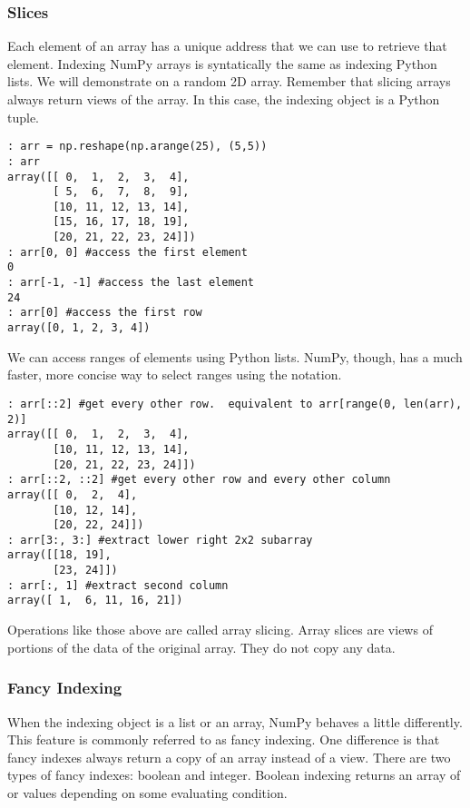 \subsubsection*{Slices}
Each element of an array has a unique address that we can use to retrieve that element.
Indexing NumPy arrays is syntatically the same as indexing Python lists.
We will demonstrate on a random 2D array.
Remember that slicing arrays always return views of the array.
In this case, the indexing object is a Python tuple.

\begin{lstlisting}
: arr = np.reshape(np.arange(25), (5,5))
: arr
array([[ 0,  1,  2,  3,  4],
       [ 5,  6,  7,  8,  9],
       [10, 11, 12, 13, 14],
       [15, 16, 17, 18, 19],
       [20, 21, 22, 23, 24]])
: arr[0, 0] #access the first element
0
: arr[-1, -1] #access the last element
24
: arr[0] #access the first row
array([0, 1, 2, 3, 4])
\end{lstlisting}
We can access ranges of elements using Python lists.
NumPy, though, has a much faster, more concise way to select ranges using the  notation.

\begin{lstlisting}
: arr[::2] #get every other row.  equivalent to arr[range(0, len(arr), 2)]
array([[ 0,  1,  2,  3,  4],
       [10, 11, 12, 13, 14],
       [20, 21, 22, 23, 24]])
: arr[::2, ::2] #get every other row and every other column
array([[ 0,  2,  4],
       [10, 12, 14],
       [20, 22, 24]])
: arr[3:, 3:] #extract lower right 2x2 subarray
array([[18, 19],
       [23, 24]])
: arr[:, 1] #extract second column
array([ 1,  6, 11, 16, 21])
\end{lstlisting}

Operations like those above are called array slicing.
Array slices are views of portions of the data of the original array.
They do not copy any data.

\subsubsection*{Fancy Indexing}
When the indexing object is a list or an array, NumPy behaves a little differently.
This feature is commonly referred to as fancy indexing.
One difference is that fancy indexes always return a copy of an array instead of a view.
There are two types of fancy indexes: boolean and integer.
Boolean indexing returns an array of  or  values depending on some evaluating condition.

